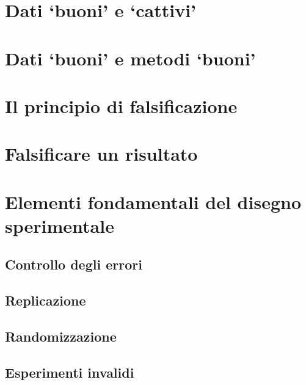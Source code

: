 \documentclass[a4paper,12pt,oneside]{book}
\begin{document}
\hypertarget{dati-buoni-e-cattivi}{%
\section{Dati `buoni' e `cattivi'}\label{dati-buoni-e-cattivi}}

\hypertarget{dati-buoni-e-metodi-buoni}{%
\section{Dati `buoni' e metodi `buoni'}\label{dati-buoni-e-metodi-buoni}}

\hypertarget{il-principio-di-falsificazione}{%
\section{Il principio di falsificazione}\label{il-principio-di-falsificazione}}

\hypertarget{falsificare-un-risultato}{%
\section{Falsificare un risultato}\label{falsificare-un-risultato}}

\hypertarget{elementi-fondamentali-del-disegno-sperimentale}{%
\section{Elementi fondamentali del disegno sperimentale}\label{elementi-fondamentali-del-disegno-sperimentale}}

\hypertarget{controllo-degli-errori}{%
\subsection{Controllo degli errori}\label{controllo-degli-errori}}

\hypertarget{replicazione}{%
\subsection{Replicazione}\label{replicazione}}

\hypertarget{randomizzazione}{%
\subsection{Randomizzazione}\label{randomizzazione}}

\hypertarget{esperimenti-invalidi}{%
\subsection{Esperimenti invalidi}\label{esperimenti-invalidi}}
\end{document}
